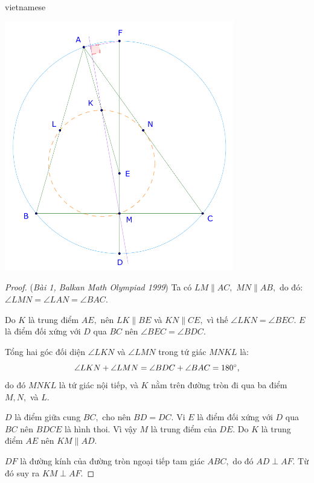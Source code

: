 \documentclass{article}
\begin{document}
\begin{otherlanguage*}{vietnamese}
\begin{center}
    \includegraphics[width=10cm]{./svg/pdf/pi-2024-1-p4.pdf}
\end{center}

\begin{proof} (\textit{Bài 1, Balkan Math Olympiad 1999})
    Ta có $LM \parallel AC,$ $MN \parallel AB,$ do đó: $\angle LMN = \angle LAN = \angle BAC.$

    Do $K$ là trung điểm $AE,$ nên $LK \parallel BE$ và $KN \parallel CE,$ vì thế $\angle LKN = \angle BEC.$
    $E$ là điểm đối xứng với $D$ qua $BC$ nên $\angle BEC = \angle BDC.$

    Tổng hai góc đối diện $\angle LKN$ và $\angle LMN$ trong tứ giác $MNKL$ là:
    \[
        \angle LKN + \angle LMN = \angle BDC + \angle BAC = 180^\circ,
    \]
    do đó $MNKL$ là tứ giác nội tiếp, và $K$ nằm trên đường tròn đi qua ba điểm $M, N,$ và $L.$

    $D$ là điểm giữa cung $BC,$ cho nên $BD = DC.$ Vi $E$ là điểm đối xứng với $D$ qua $BC$ nên $BDCE$ là hình thoi.
    Vì vậy $M$ là trung điểm của $DE.$ Do $K$ là trung điểm $AE$ nên $KM \parallel AD.$
    
    $DF$ là đường kính của đường tròn ngoại tiếp tam giác $ABC,$ do đó $AD \perp AF.$
    Từ đó suy ra $KM \perp AF.$
\end{proof}

\end{otherlanguage*}
\end{document}
